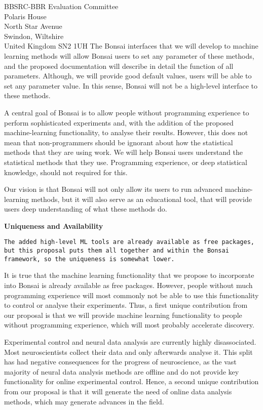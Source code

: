 \documentclass[12pt]{letter}
\begin{document}
\begin{letter}{
    BBSRC-BBR Evaluation Committee\\
    Polaris House\\
    North Star Avenue\\
    Swindon, Wiltshire\\
    United Kingdom SN2 1UH
}
The Bonsai interfaces that we will develop to machine learning methods will
allow Bonsai users to set any parameter of these methods, and the proposed
documentation will describe in detail the function of all parameters. Although,
we will provide good default values, users will be able to set any parameter
value. In this sense, Bonsai will not be a high-level interface to these
methods.

A central goal of Bonsai is to allow people without programming experience to
perform sophisticated experiments and, with the addition of the proposed
machine-learning functionality, to analyse their results. However, this does
not mean that non-programmers should be ignorant about how the statistical
methods that they are using work. We will help Bonsai users understand the
statistical methods that they use. Programming experience, or deep statistical
knowledge, should not required for this.

Our vision is that Bonsai will not only allow its users to run advanced
machine-learning methods, but it will also serve as an educational tool, that
will provide users deep understanding of what these methods do.

\noindent\textbf{Uniqueness and Availability}

\texttt{The added high-level ML tools are already available as free packages,
but this proposal puts them all together and within the Bonsai framework, so
the uniqueness is somewhat lower.}

It is true that the machine learning functionality that we propose to
incorporate into Bonsai is already available as free packages. However, people
without much programming experience will most commonly not be able to use this
functionality to control or analyse their experiments. Thus, a first unique
contribution from our proposal is that we will provide machine learning
functionality to people without programming experience, which will most
probably accelerate discovery.

Experimental control and neural data analysis are currently highly
disassociated. Most neuroscientists collect their data and only afterwards
analyse it. This split has had negative consequences for the progress of
neuroscience, as the vast majority of neural data analysis methods are offline
and do not provide key functionality for online experimental control. Hence, a
second unique contribution from our proposal is that it will generate the need
of online data analysis methods, which may generate advances in the field.

\end{letter}
\end{document}
